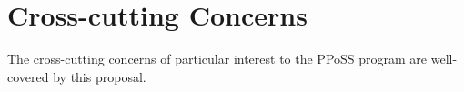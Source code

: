 \section{Cross-cutting Concerns}



The cross-cutting concerns of particular interest to the PPoSS program are well-covered by this proposal.

